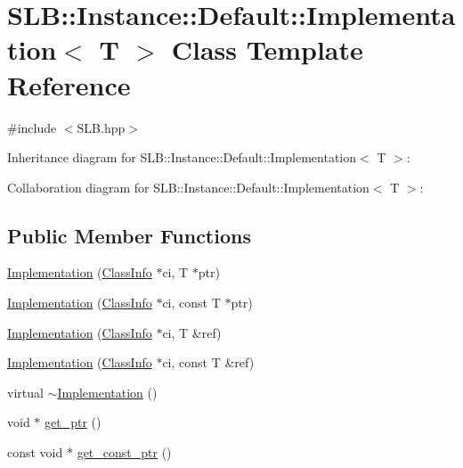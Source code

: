 \hypertarget{classSLB_1_1Instance_1_1Default_1_1Implementation}{}\section{S\+LB\+:\+:Instance\+:\+:Default\+:\+:Implementation$<$ T $>$ Class Template Reference}
\label{classSLB_1_1Instance_1_1Default_1_1Implementation}


{\ttfamily \#include $<$S\+L\+B.\+hpp$>$}



Inheritance diagram for S\+LB\+:\+:Instance\+:\+:Default\+:\+:Implementation$<$ T $>$\+:


Collaboration diagram for S\+LB\+:\+:Instance\+:\+:Default\+:\+:Implementation$<$ T $>$\+:
\subsection*{Public Member Functions}
\begin{DoxyCompactItemize}
\item 
\hyperlink{classSLB_1_1Instance_1_1Default_1_1Implementation_a56fb092839bb96e8b16207f0d907a6a0}{Implementation} (\hyperlink{classSLB_1_1ClassInfo}{Class\+Info} $\ast$ci, T $\ast$ptr)
\item 
\hyperlink{classSLB_1_1Instance_1_1Default_1_1Implementation_a761f6ae8d266faa01bf69bf7764a1e08}{Implementation} (\hyperlink{classSLB_1_1ClassInfo}{Class\+Info} $\ast$ci, const T $\ast$ptr)
\item 
\hyperlink{classSLB_1_1Instance_1_1Default_1_1Implementation_a0adb45c813e7ef64d87a1385712f8a16}{Implementation} (\hyperlink{classSLB_1_1ClassInfo}{Class\+Info} $\ast$ci, T \&ref)
\item 
\hyperlink{classSLB_1_1Instance_1_1Default_1_1Implementation_a0bfe0f920010baa48806f5b29af10dfa}{Implementation} (\hyperlink{classSLB_1_1ClassInfo}{Class\+Info} $\ast$ci, const T \&ref)
\item 
virtual \hyperlink{classSLB_1_1Instance_1_1Default_1_1Implementation_a399847db97d2bb38aabc517bf86a1883}{$\sim$\+Implementation} ()
\item 
void $\ast$ \hyperlink{classSLB_1_1Instance_1_1Default_1_1Implementation_a15447f209379cf08a88e6ec22fe00dc4}{get\+\_\+ptr} ()
\item 
const void $\ast$ \hyperlink{classSLB_1_1Instance_1_1Default_1_1Implementation_a1a06b9aec11368b2e28cd3b99bd270f1}{get\+\_\+const\+\_\+ptr} ()
\end{DoxyCompactItemize}
